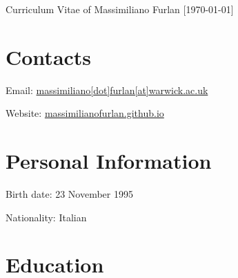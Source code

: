 \documentclass[11pt,a4paper]{article}
\begin{document}
\date{}
\thispagestyle{empty}
\setlength\cvlabelwidth{90pt}

\begin{cv}{\huge Curriculum Vitae of Massimiliano Furlan \normalsize{[\mydatestyle\today]}} %

\section{Contacts}

\begin{cvlist}{}
	\itemsep -4pt
	\item[Email:] \href{mailto:massimiliano[dot]furlan[at]warwick.ac.uk}{massimiliano[dot]furlan[at]warwick.ac.uk}
	\item[Website:] \href{https://massimilianofurlan.github.io}{massimilianofurlan.github.io}
\end{cvlist}
\vspace{-20pt}

\section{Personal Information}

\begin{cvlist}{}
	\itemsep -4pt
	\item[Birth date:] 23 November 1995
	\item[Nationality:] Italian
\end{cvlist}
\vspace{-20pt}

\section{Education}


\end{cv}
\end{document}
